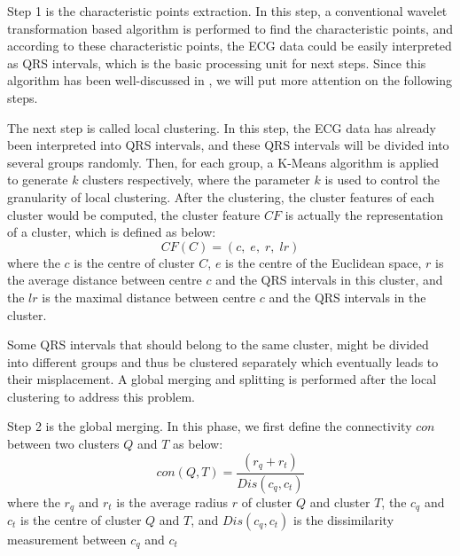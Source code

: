 \documentclass[conference]{IEEEtran}
\begin{document}
Step 1 is the characteristic points extraction. In this step, a conventional wavelet transformation based algorithm is performed to find the characteristic points, and according to these characteristic points, the ECG data could be easily interpreted as QRS intervals, which is the basic processing unit for next steps. Since this algorithm has been well-discussed in \cite{li1995detection}, we will put more attention on the following steps.


The next step is called local clustering. In this step, the ECG data has already been interpreted into QRS intervals, and these QRS intervals will be divided into several groups randomly. Then, for each group, a K-Means algorithm is applied to generate $ k $ clusters respectively, where the parameter $ k $ is used to control the granularity of local clustering. After the clustering, the cluster features of each cluster would be computed, the cluster feature $ CF $ is actually the representation of a cluster, which is defined as below:
\begin{equation}
CF(C) = (c, \; e, \; r, \; lr)
\end{equation} 
where the $ c $ is the centre of cluster $ C $, $ e $ is the centre of the Euclidean space, $ r $ is the average distance between centre $ c $ and the QRS intervals in this cluster, and the $ lr $ is the maximal distance between centre $ c $ and the QRS intervals in the cluster. 


Some QRS intervals that should belong to the same cluster,  might be divided into different groups and thus be clustered separately which eventually leads to their misplacement. A global merging and splitting is performed after the local clustering to address this problem. 


Step 2 is the global merging. In this phase, we first define the connectivity $ con $ between two clusters $ Q $ and $ T $ as below:
\begin{equation}\label{eq_connectivity}
con(Q, T) = \frac{(r_q + r_t)}{Dis(c_q, c_t)} 
\end{equation}
where the $ r_q $ and $ r_t $ is the average radius $ r $ of cluster $ Q $ and cluster $ T $, the $ c_q $ and $ c_t $ is the centre of cluster $ Q $ and $ T $, and $ Dis(c_q, c_t) $ is the dissimilarity measurement between $ c_q $ and $ c_t $
\end{document}
